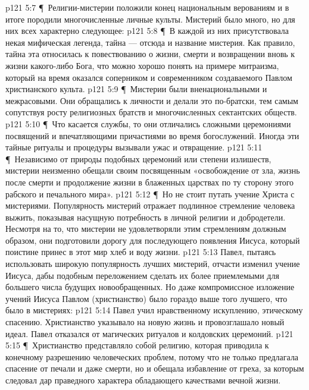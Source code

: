 \vs p121 5:7 \P\ Религии\hyp{}мистерии положили конец национальным верованиям и в итоге породили многочисленные личные культы. Мистерий было много, но для них всех характерно следующее:
\vs p121 5:8 \P\ \bibnobreakspace В каждой из них присутствовала некая мифическая легенда, тайна --- отсюда и название мистерия. Как правило, тайна эта относилась к повествованию о жизни, смерти и возвращении вновь к жизни какого\hyp{}либо Бога, что можно хорошо понять на примере митраизма, который на время оказался соперником и современником создаваемого Павлом христианского культа.
\vs p121 5:9 \P\ \bibnobreakspace Мистерии были вненациональными и межрасовыми. Они обращались к личности и делали это по\hyp{}братски, тем самым сопутствуя росту религиозных братств и многочисленных сектантских обществ.
\vs p121 5:10 \P\ \bibnobreakspace Что касается службы, то они отличались сложными церемониями посвящений и впечатляющими причастиями во время богослужений. Иногда эти тайные ритуалы и процедуры вызывали ужас и отвращение.
\vs p121 5:11 \P\ \bibnobreakspace Независимо от природы подобных церемоний или степени излишеств, мистерии неизменно обещали своим посвященным  «освобождение от зла, жизнь после смерти и продолжение жизни в блаженных царствах по ту сторону этого рабского и печального мира».
\vs p121 5:12 \P\ Но не стоит путать учение Христа с мистериями. Популярность мистерий отражает подлинное стремление человека выжить, показывая насущную потребность в личной религии и добродетели. Несмотря на то, что мистерии не удовлетворяли этим стремлениям должным образом, они подготовили дорогу для последующего появления Иисуса, который поистине принес в этот мир хлеб и воду жизни.
\vs p121 5:13 Павел, пытаясь использовать широкую популярность лучших мистерий, отчасти изменил учение Иисуса, дабы подобным переложением сделать их более приемлемыми для большего числа будущих новообращенных. Но даже компромиссное изложение учений Иисуса Павлом (христианство) было гораздо выше того лучшего, что было в мистериях:
\vs p121 5:14 \bibnobreakspace Павел учил нравственному искуплению, этическому спасению. Христианство указывало на новую жизнь и провозглашало новый идеал. Павел отказался от магических ритуалов и колдовских церемоний.
\vs p121 5:15 \P\ \bibnobreakspace Христианство представляло собой религию, которая приводила к конечному разрешению человеческих проблем, потому что не только предлагала спасение от печали и даже смерти, но и обещала избавление от греха, за которым следовал дар праведного характера обладающего качествами вечной жизни.
